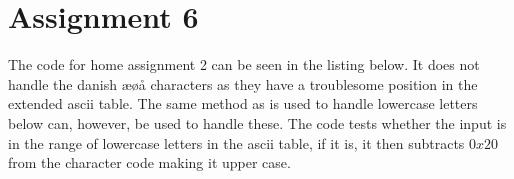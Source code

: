 \section{Assignment 6}
The code for home assignment 2 can be seen in the listing below. It does not handle the danish æøå characters as
they have a troublesome position in the extended ascii table. The same method as is used to handle lowercase letters
below can, however, be used to handle these. The code tests whether the input is in the range of lowercase letters in
 the ascii table, if it is, it then subtracts \(0x20\) from the character code making it upper case.

